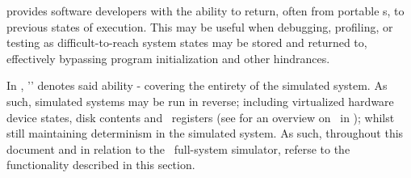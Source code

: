  provides software developers with the ability to return, often from portable \dvttermcheckpoint s, to previous states of execution.
This may be useful when debugging, profiling, or testing as difficult-to-reach system states may be stored and returned to, effectively bypassing program initialization and other hindrances.

In \dvttermsimics , '\dvttermreverseexecution ' denotes said ability - covering the entirety of the simulated system.
As such, simulated systems may be run in reverse; including virtualized hardware device states, disk contents and \dvttermcpu\ registers (see  for an overview on \dvttermreverseexecution\ in \dvttermsimics ); whilst still maintaining determinism in the simulated system.
As such, throughout this document and in relation to the \dvttermsimics\ full-system simulator, \dvttermreverseexecution referse to the functionality described in this section.
